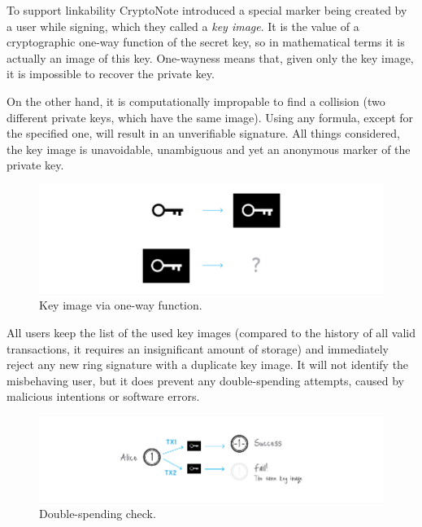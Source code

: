 To support linkability CryptoNote introduced a special marker being created by a user while signing, which they called a \emph{key image}. It is the value of a cryptographic one-way function of the secret key, so in mathematical terms it is actually an image of this key. One-wayness means that, given only the key image, it is impossible to recover the private key.

On the other hand, it is computationally impropable to find a collision (two different private keys, which have the same image). Using any formula, except for the specified one, will result in an unverifiable signature. All things considered, the key image is unavoidable, unambiguous and yet an anonymous marker of the private key.

\begin{figure}[H]
  \centering
  \includegraphics[width=1 \columnwidth,keepaspectratio]{Images/CryptoNote/key_image.png}
  \caption{Key image via one-way function.~\cite{cryptonote}}
  \label{fig:key_image}
\end{figure}

All users keep the list of the used key images (compared to the history of all valid transactions, it requires an insignificant amount of storage) and immediately reject any new ring signature with a duplicate key image. It will not identify the misbehaving user, but it does prevent any double-spending attempts, caused by malicious intentions or software errors.
\begin{figure}[H]
  \centering
  \includegraphics[width=1.2 \columnwidth,keepaspectratio]{Images/CryptoNote/double_spending.png}
  \caption{Double-spending check.~\cite{cryptonote}}
  \label{fig:double_spending}
\end{figure}
\vspace{0.2cm}

